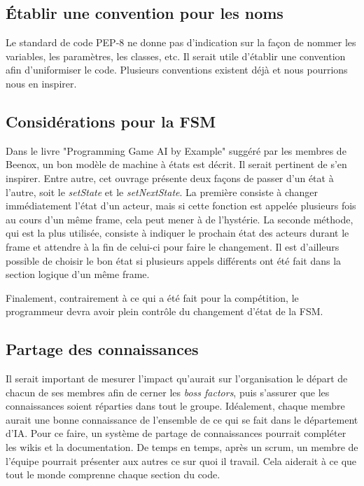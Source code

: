 \documentclass[12pt,letterpaper,twoside]{article}
\begin{document}
\subsection*{Établir une convention pour les noms}
Le standard de code PEP-8 ne donne pas d'indication sur la façon de nommer les variables, les paramètres, les classes, etc. Il serait utile d'établir une convention afin d'uniformiser le code. Plusieurs conventions existent déjà et nous pourrions nous en inspirer.

\subsection*{Considérations pour la FSM}
Dans le livre "Programming Game AI by Example" suggéré par les membres de Beenox, un bon modèle de machine à états est décrit. Il serait pertinent de s'en inspirer. Entre autre, cet ouvrage présente deux façons de passer d'un état à l'autre, soit le \emph{setState} et le \emph{setNextState}. La première consiste à changer immédiatement l'état d'un acteur, mais si cette fonction est appelée plusieurs fois au cours d'un même frame, cela peut mener à de l'hystérie. La seconde méthode, qui est la plus utilisée, consiste à indiquer le prochain état des acteurs durant le frame et attendre à la fin de celui-ci pour faire le changement. Il est d'ailleurs possible de choisir le bon état si plusieurs appels différents ont été fait dans la section logique d'un même frame.

Finalement, contrairement à ce qui a été fait pour la compétition, le programmeur devra avoir plein contrôle du changement d'état de la FSM.

\subsection*{Partage des connaissances}
Il serait important de mesurer l'impact qu'aurait sur l'organisation le départ de chacun de ses membres afin de cerner les \emph{boss factors}, puis s'assurer que les connaissances soient réparties dans tout le groupe.  Idéalement, chaque membre aurait une bonne connaissance de l'ensemble de ce qui se fait dans le département d'IA. Pour ce faire, un système de partage de connaissances pourrait compléter les wikis et la documentation. De temps en temps, après un scrum, un membre de l'équipe pourrait présenter aux autres ce sur quoi il travail. Cela aiderait à ce que tout le monde comprenne chaque section du code.
\end{document}

